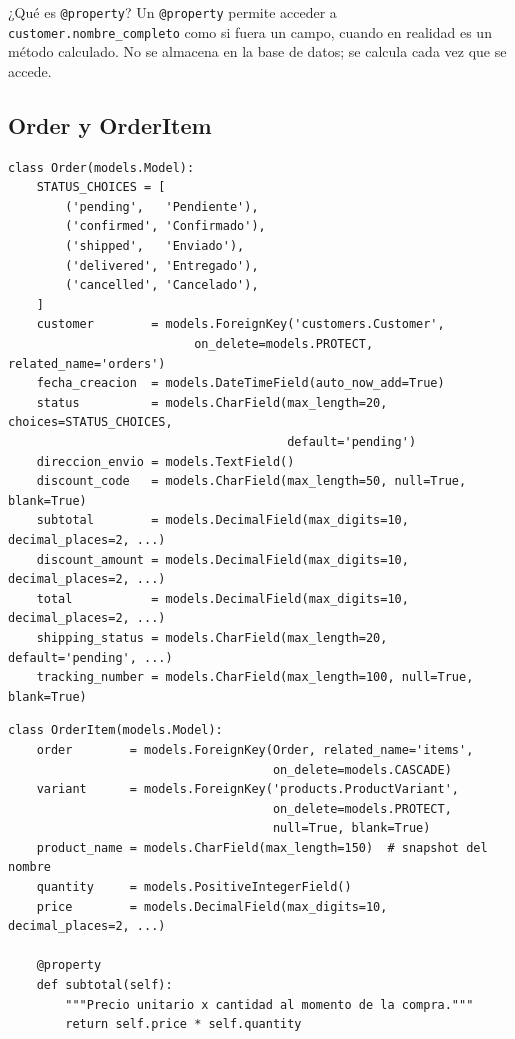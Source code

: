 \documentclass[12pt, a4paper]{article}
\begin{document}
\begin{conceptbox}{¿Qué es \texttt{@property}?}
Un \texttt{@property} permite acceder a \texttt{customer.nombre\_completo} como si
fuera un campo, cuando en realidad es un método calculado. No se almacena en la
base de datos; se calcula cada vez que se accede.
\end{conceptbox}

\subsection{Order y OrderItem}

\begin{lstlisting}[caption={orders/models.py -- Orden con estados y snapshots}]
class Order(models.Model):
    STATUS_CHOICES = [
        ('pending',   'Pendiente'),
        ('confirmed', 'Confirmado'),
        ('shipped',   'Enviado'),
        ('delivered', 'Entregado'),
        ('cancelled', 'Cancelado'),
    ]
    customer        = models.ForeignKey('customers.Customer',
                          on_delete=models.PROTECT, related_name='orders')
    fecha_creacion  = models.DateTimeField(auto_now_add=True)
    status          = models.CharField(max_length=20, choices=STATUS_CHOICES,
                                       default='pending')
    direccion_envio = models.TextField()
    discount_code   = models.CharField(max_length=50, null=True, blank=True)
    subtotal        = models.DecimalField(max_digits=10, decimal_places=2, ...)
    discount_amount = models.DecimalField(max_digits=10, decimal_places=2, ...)
    total           = models.DecimalField(max_digits=10, decimal_places=2, ...)
    shipping_status = models.CharField(max_length=20, default='pending', ...)
    tracking_number = models.CharField(max_length=100, null=True, blank=True)
\end{lstlisting}

\begin{lstlisting}[caption={orders/models.py -- OrderItem con snapshots del precio}]
class OrderItem(models.Model):
    order        = models.ForeignKey(Order, related_name='items',
                                     on_delete=models.CASCADE)
    variant      = models.ForeignKey('products.ProductVariant',
                                     on_delete=models.PROTECT,
                                     null=True, blank=True)
    product_name = models.CharField(max_length=150)  # snapshot del nombre
    quantity     = models.PositiveIntegerField()
    price        = models.DecimalField(max_digits=10, decimal_places=2, ...)

    @property
    def subtotal(self):
        """Precio unitario x cantidad al momento de la compra."""
        return self.price * self.quantity
\end{lstlisting}
\end{document}
